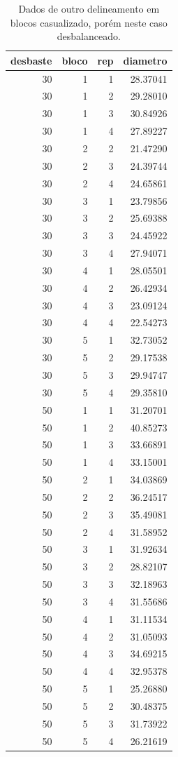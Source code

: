 \documentclass[
]{article}
\begin{document}
\begin{table}

\caption{\label{tab:unnamed-chunk-73}Dados de outro delineamento em blocos casualizado, porém neste caso desbalanceado.}
\centering
\begin{tabular}[t]{r|r|r|r}
\hline
desbaste & bloco & rep & diametro\\
\hline
30 & 1 & 1 & 28.37041\\
\hline
30 & 1 & 2 & 29.28010\\
\hline
30 & 1 & 3 & 30.84926\\
\hline
30 & 1 & 4 & 27.89227\\
\hline
30 & 2 & 2 & 21.47290\\
\hline
30 & 2 & 3 & 24.39744\\
\hline
30 & 2 & 4 & 24.65861\\
\hline
30 & 3 & 1 & 23.79856\\
\hline
30 & 3 & 2 & 25.69388\\
\hline
30 & 3 & 3 & 24.45922\\
\hline
30 & 3 & 4 & 27.94071\\
\hline
30 & 4 & 1 & 28.05501\\
\hline
30 & 4 & 2 & 26.42934\\
\hline
30 & 4 & 3 & 23.09124\\
\hline
30 & 4 & 4 & 22.54273\\
\hline
30 & 5 & 1 & 32.73052\\
\hline
30 & 5 & 2 & 29.17538\\
\hline
30 & 5 & 3 & 29.94747\\
\hline
30 & 5 & 4 & 29.35810\\
\hline
50 & 1 & 1 & 31.20701\\
\hline
50 & 1 & 2 & 40.85273\\
\hline
50 & 1 & 3 & 33.66891\\
\hline
50 & 1 & 4 & 33.15001\\
\hline
50 & 2 & 1 & 34.03869\\
\hline
50 & 2 & 2 & 36.24517\\
\hline
50 & 2 & 3 & 35.49081\\
\hline
50 & 2 & 4 & 31.58952\\
\hline
50 & 3 & 1 & 31.92634\\
\hline
50 & 3 & 2 & 28.82107\\
\hline
50 & 3 & 3 & 32.18963\\
\hline
50 & 3 & 4 & 31.55686\\
\hline
50 & 4 & 1 & 31.11534\\
\hline
50 & 4 & 2 & 31.05093\\
\hline
50 & 4 & 3 & 34.69215\\
\hline
50 & 4 & 4 & 32.95378\\
\hline
50 & 5 & 1 & 25.26880\\
\hline
50 & 5 & 2 & 30.48375\\
\hline
50 & 5 & 3 & 31.73922\\
\hline
50 & 5 & 4 & 26.21619\\
\hline
\end{tabular}
\end{table}
\end{document}
